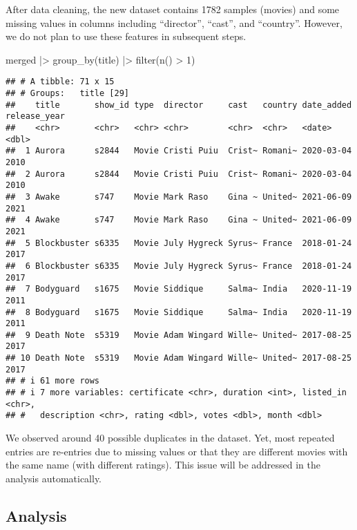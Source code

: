 \documentclass[
]{article}
\newenvironment{Shaded}{\begin{snugshade}}{\end{snugshade}}
\newcommand{\DecValTok}[1]{\textcolor[rgb]{0.00,0.00,0.81}{#1}}
\newcommand{\FunctionTok}[1]{\textcolor[rgb]{0.00,0.00,0.00}{#1}}
\newcommand{\NormalTok}[1]{#1}
\newcommand{\SpecialCharTok}[1]{\textcolor[rgb]{0.00,0.00,0.00}{#1}}
\begin{document}
After data cleaning, the new dataset contains 1782 samples (movies) and
some missing values in columns including ``director'', ``cast'', and
``country''. However, we do not plan to use these features in subsequent
steps.

\begin{Shaded}
\begin{Highlighting}[]
\NormalTok{merged }\SpecialCharTok{|\textgreater{}}
  \FunctionTok{group\_by}\NormalTok{(title) }\SpecialCharTok{|\textgreater{}}
  \FunctionTok{filter}\NormalTok{(}\FunctionTok{n}\NormalTok{() }\SpecialCharTok{\textgreater{}} \DecValTok{1}\NormalTok{)}
\end{Highlighting}
\end{Shaded}

\begin{verbatim}
## # A tibble: 71 x 15
## # Groups:   title [29]
##    title       show_id type  director     cast   country date_added release_year
##    <chr>       <chr>   <chr> <chr>        <chr>  <chr>   <date>            <dbl>
##  1 Aurora      s2844   Movie Cristi Puiu  Crist~ Romani~ 2020-03-04         2010
##  2 Aurora      s2844   Movie Cristi Puiu  Crist~ Romani~ 2020-03-04         2010
##  3 Awake       s747    Movie Mark Raso    Gina ~ United~ 2021-06-09         2021
##  4 Awake       s747    Movie Mark Raso    Gina ~ United~ 2021-06-09         2021
##  5 Blockbuster s6335   Movie July Hygreck Syrus~ France  2018-01-24         2017
##  6 Blockbuster s6335   Movie July Hygreck Syrus~ France  2018-01-24         2017
##  7 Bodyguard   s1675   Movie Siddique     Salma~ India   2020-11-19         2011
##  8 Bodyguard   s1675   Movie Siddique     Salma~ India   2020-11-19         2011
##  9 Death Note  s5319   Movie Adam Wingard Wille~ United~ 2017-08-25         2017
## 10 Death Note  s5319   Movie Adam Wingard Wille~ United~ 2017-08-25         2017
## # i 61 more rows
## # i 7 more variables: certificate <chr>, duration <int>, listed_in <chr>,
## #   description <chr>, rating <dbl>, votes <dbl>, month <dbl>
\end{verbatim}

We observed around 40 possible duplicates in the dataset. Yet, most
repeated entries are re-entries due to missing values or that they are
different movies with the same name (with different ratings). This issue
will be addressed in the analysis automatically.

\hypertarget{analysis}{%
\subsection{Analysis}\label{analysis}}
\end{document}
